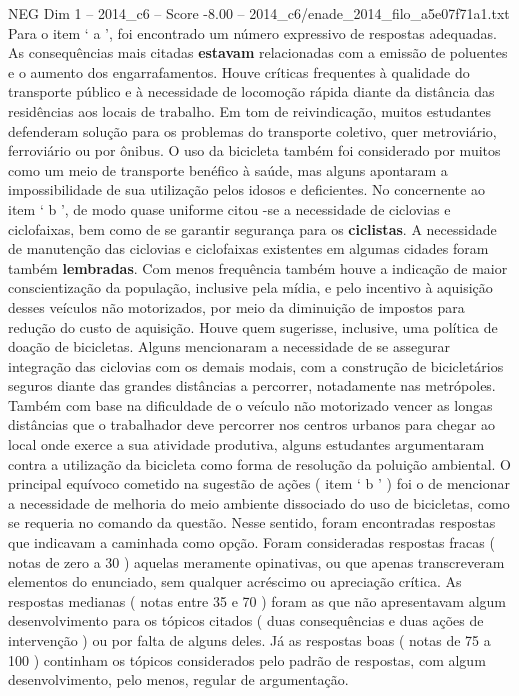 \begin{textsample}{NEG Dim 1 – 2014\_c6 – Score -8.00 – 2014\_c6/enade\_2014\_filo\_a5e07f71a1.txt}
Para o item ‘ a ’, foi encontrado um número expressivo de respostas adequadas.
As consequências mais citadas \textbf{estavam} relacionadas com a emissão de poluentes e o aumento dos engarrafamentos.
Houve críticas frequentes à qualidade do transporte público e à necessidade de locomoção rápida diante da distância das residências aos locais de trabalho.
Em tom de reivindicação, muitos estudantes defenderam solução para os problemas do transporte coletivo, quer metroviário, ferroviário ou por ônibus.
O uso da bicicleta também foi considerado por muitos como um meio de transporte benéfico à saúde, mas alguns apontaram a impossibilidade de sua utilização pelos idosos e deficientes.
No concernente ao item ‘ b ’, de modo quase uniforme citou -se a necessidade de ciclovias e ciclofaixas, bem como de se garantir segurança para os \textbf{ciclistas}.
A necessidade de manutenção das ciclovias e ciclofaixas existentes em algumas cidades foram também \textbf{lembradas}.
Com menos frequência também houve a indicação de maior conscientização da população, inclusive pela mídia, e pelo incentivo à aquisição desses veículos não motorizados, por meio da diminuição de impostos para redução do custo de aquisição.
Houve quem sugerisse, inclusive, uma política de doação de bicicletas.
Alguns mencionaram a necessidade de se assegurar integração das ciclovias com os demais modais, com a construção de bicicletários seguros diante das grandes distâncias a percorrer, notadamente nas metrópoles.
Também com base na dificuldade de o veículo não motorizado vencer as longas distâncias que o trabalhador deve percorrer nos centros urbanos para chegar ao local onde exerce a sua atividade produtiva, alguns estudantes argumentaram contra a utilização da bicicleta como forma de resolução da poluição ambiental.
O principal equívoco cometido na sugestão de ações ( item ‘ b ’ ) foi o de mencionar a necessidade de melhoria do meio ambiente dissociado do uso de bicicletas, como se requeria no comando da questão.
Nesse sentido, foram encontradas respostas que indicavam a caminhada como opção.
Foram consideradas respostas fracas ( notas de zero a 30 ) aquelas meramente opinativas, ou que apenas transcreveram elementos do enunciado, sem qualquer acréscimo ou apreciação crítica.
As respostas medianas ( notas entre 35 e 70 ) foram as que não apresentavam algum desenvolvimento para os tópicos citados ( duas consequências e duas ações de intervenção ) ou por falta de alguns deles.
Já as respostas boas ( notas de 75 a 100 ) continham os tópicos considerados pelo padrão de respostas, com algum desenvolvimento, pelo menos, regular de argumentação.

\end{textsample}
